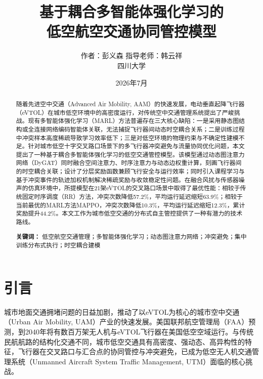 \documentclass[12pt,a4paper,UTF8]{ctexart}
\title{\textbf{基于耦合多智能体强化学习的\\低空航空交通协同管控模型}}
\author{作者：彭义森 \quad 指导老师：韩云祥 \\ 四川大学}
\date{2026年7月}
\begin{document}
\maketitle

\begin{abstract}
随着先进空中交通（Advanced Air Mobility, AAM）的快速发展，电动垂直起降飞行器（eVTOL）在城市低空环境中的高密度运行，对传统空中交通管理系统提出了严峻挑战。现有多智能体强化学习（MARL）方法普遍存在三大核心缺陷：一是采用静态图结构或全连接网络编码智能体关联，无法捕捉飞行器间动态时空耦合关系；二是训练过程中冲突样本高度稀疏导致学习效率低下；三是对低空环境的物理约束与不确定性建模不足。针对城市低空十字交叉路口场景下的多飞行器冲突避免与流量协同优化问题，本文提出了一种基于耦合多智能体强化学习的低空交通管控模型。该模型通过动态图注意力网络（DyGAT）同时融合空间注意力、时序注意力与动态边权重计算，刻画飞行器间的时空耦合关联；设计了分层奖励函数兼顾飞行安全与运行效率；同时引入课程学习与基于冲突事件的轨迹加权机制解决稀疏奖励与收敛稳定性问题。在融合风扰与传感器噪声的仿真环境中，所提模型在21架eVTOL的交叉路口场景中取得了最优性能：相较于传统固定时序调度（RR）方法，冲突次数降低57.2\%，平均运行延迟缩短63.9\%；相较于当前最优的MARL方法MAPPO，冲突次数降低10.3\%，平均运行延迟缩短12.3\%，累计奖励提升44.2\%。本文工作为城市低空交通的分布式自主管控提供了一种有潜力的技术路线。

\noindent \textbf{关键词：} 低空航空交通管理；多智能体强化学习；动态图注意力网络；冲突避免；集中训练分布式执行；时空耦合建模
\end{abstract}

\section{引言}

城市地面交通拥堵问题的日益加剧，推动了以eVTOL为核心的城市空中交通（Urban Air Mobility, UAM）产业的快速发展。美国联邦航空管理局（FAA）预测，到2040年将有数百万架无人机与eVTOL飞行器在美国低空空域运行。与传统民航航路的结构化交通不同，城市低空交通具有高密度、强动态、高异构性的特征，飞行器在交叉路口与汇合点的协同管控与冲突避免，已成为低空无人机交通管理系统（Unmanned Aircraft System Traffic Management, UTM）面临的核心挑战。
\end{document}
